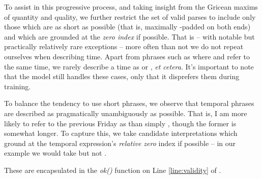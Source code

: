 To assist in this progressive process, and taking insight from the Gricean 
	maxims of quantity and quality, we further restrict the set of valid 
	parses to include only those which are as short as possible
	(that is, maximally -padded on both ends) and which are grounded
	at the \textit{zero index} if possible.
That is -- with notable but practically relatively rare exceptions --
	more often than not we do not repeat ourselves when describing time.
Apart from phrases such as  where 
	and  refer to the same time, we rarely describe a time as
	 or , \textit{et cetera}.
It's important to note that the model still handles these cases, only that it
	disprefers them during training.

To balance the tendency to use short phrases, we observe that
	temporal phrases are described as pragmatically unambiguously as possible.
That is, I am more likely to refer to the previous Friday as 
	than simply , though the former is somewhat longer.
To capture this, we take candidate interpretations which ground at the
	temporal expression's \textit{relative zero} index if possible --
	in our example we would take  but not .

These are encapsulated in the \textit{ok()} function
	on Line \ref{line:validity} of .


